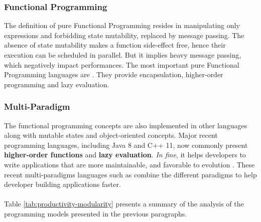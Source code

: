 \subsubsection{Functional Programming} \label{chapter3:software-productivity:programming-models:functional-programming}


The definition of pure Functional Programming resides in manipulating only expressions and forbidding state mutability, replaced by message passing.
The absence of state mutability makes a function side-effect free, hence their execution can be scheduled in parallel.
But it implies heavy message passing, which negatively impact performances.
The most important pure Functional Programming languages are .
They provide encapsulation, higher-order programming and lazy evaluation.

\subsubsection{Multi-Paradigm}

The functional programming concepts are also implemented in other languages along with mutable states and object-oriented concepts.
Major recent programming languages, including Java 8 and C++ 11, now commonly present \textbf{higher-order functions} and \textbf{lazy evaluation}. %
\textit{In fine}, it helps developers to write applications that are more maintainable, and favorable to evolution \cite{Hughes1989,Turner1981}.
These recent multi-paradigms languages such as  combine the different paradigms to help developer building applications faster.

\paragraph{}

Table \ref{tab:productivity-modularity} presents a summary of the analysis of the programming models presented in the previous paragraphs.

